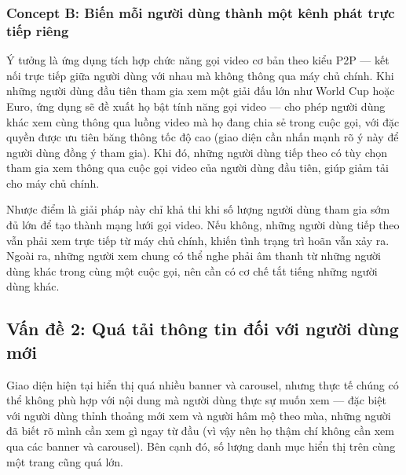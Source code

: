 \subsubsection{Concept B: Biến mỗi người dùng thành một kênh phát trực tiếp riêng}

Ý tưởng là ứng dụng tích hợp chức năng gọi video cơ bản theo kiểu P2P — kết nối trực tiếp giữa người dùng với nhau mà không thông qua máy chủ chính. Khi những người dùng đầu tiên tham gia xem một giải đấu lớn như World Cup hoặc Euro, ứng dụng sẽ đề xuất họ bật tính năng gọi video — cho phép người dùng khác xem cùng thông qua luồng video mà họ đang chia sẻ trong cuộc gọi, với đặc quyền được ưu tiên băng thông tốc độ cao (giao diện cần nhấn mạnh rõ ý này để người dùng đồng ý tham gia). Khi đó, những người dùng tiếp theo có tùy chọn tham gia xem thông qua cuộc gọi video của người dùng đầu tiên, giúp giảm tải cho máy chủ chính.

Nhược điểm là giải pháp này chỉ khả thi khi số lượng người dùng tham gia sớm đủ lớn để tạo thành mạng lưới gọi video. Nếu không, những người dùng tiếp theo vẫn phải xem trực tiếp từ máy chủ chính, khiến tình trạng trì hoãn vẫn xảy ra. Ngoài ra, những người xem chung có thể nghe phải âm thanh từ những người dùng khác trong cùng một cuộc gọi, nên cần có cơ chế tắt tiếng những người dùng khác.

%
%

\subsection{Vấn đề 2: Quá tải thông tin đối với người dùng mới}

Giao diện hiện tại hiển thị quá nhiều banner và carousel, nhưng thực tế chúng có thể không phù hợp với nội dung mà người dùng thực sự muốn xem — đặc biệt với người dùng thỉnh thoảng mới xem và người hâm mộ theo mùa, những người đã biết rõ mình cần xem gì ngay từ đầu (vì vậy nên họ thậm chí không cần xem qua các banner và carousel). Bên cạnh đó, số lượng danh mục hiển thị trên cùng một trang cũng quá lớn.

